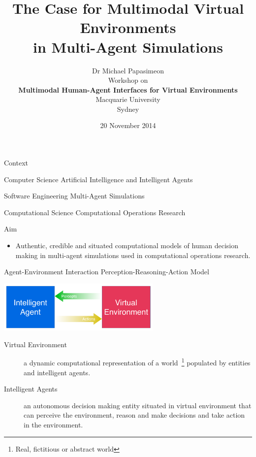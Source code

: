 \documentclass[aspectratio=1610,xcolor=dvipsnames,t]{beamer}
\title[Multimodal Virtual Environments]{The Case for Multimodal Virtual
Environments\\ in Multi-Agent Simulations}
\author[Michael Papasimeon]{Dr Michael Papasimeon \\[0.2in] 
                Workshop on\\ 
                \textbf{Multimodal Human-Agent Interfaces for Virtual Environments} \\[0.2in] 
                Macquarie University\\
                Sydney\\}
\date{20 November 2014}
\begin{document}
\begin{frame}
    \titlepage
\end{frame} 

\begin{frame}{Context} 

    \begin{block}{Computer Science} 
    Artificial Intelligence and Intelligent Agents 
    \end{block}

    \begin{block}{Software Engineering} 
    Multi-Agent Simulations
    \end{block} 

    \begin{block}{Computational Science} 
    Computational Operations Research
    \end{block} 
\pause
    \begin{exampleblock}{Aim} 
        \begin{itemize}
            \item Authentic, credible and situated computational models of human decision
            making in multi-agent simulations used in computational operations
            research. 
        \end{itemize} 
    \end{exampleblock} 

\end{frame} 

\begin{frame}{Agent-Environment Interaction} 
    Perception-Reasoning-Action Model 
    \begin{center}
        \includegraphics[width=8cm]{agent-env} 
    \end{center} 

    \begin{description}
        \item[Virtual Environment] a dynamic computational representation of a
        world~\footnote{Real, fictitious or abstract world} 
        populated by entities and intelligent agents. 
        \item[Intelligent Agents] an autonomous decision making entity situated
        in virtual environment that can perceive the environment, reason and
        make decisions and take action in the environment.  
    \end{description} 
\end{frame} 
\end{document}
